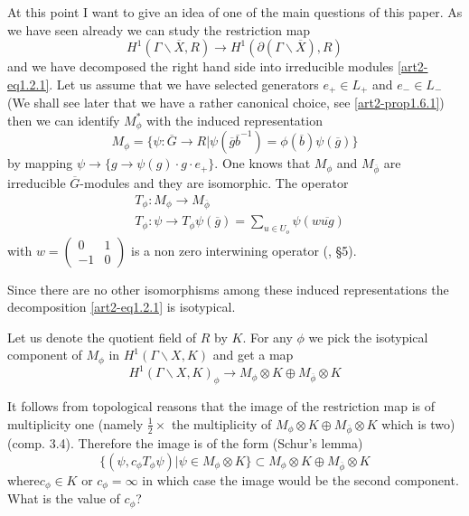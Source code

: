 \subsubsection{}\label{art2-sec1.2.2}
 At this point I want to give an idea of one of the main questions of this paper. As we have seen already we can study the restriction map
$$
H^{1}(\Gamma\backslash \overline{X},R)\to H^{1}(\partial (\Gamma\backslash \overline{X}),R)
$$
and we have decomposed the right hand side into irreducible modules \eqref{art2-eq1.2.1}. Let us assume that we have selected generators $e_{+}\in L_{+}$ and $e_{-}\in  L_{-}$ (We shall see later that we have a rather canonical choice, see \ref{art2-prop1.6.1}) then we can identify $M^{*}_{\phi}$ with the induced representation
$$
M_{\phi}=\{\psi :\overline{G}\to R|\psi(\overline{g}\overline{b}^{-1})=\phi(\overline{b})\psi(\overline{g})\}
$$
by mapping $\psi\to \{g\to \psi(g)\cdot g\cdot e_{+}\}$. One knows that $M_{\phi}$ and $M_{\overline{\phi}}$ are irreducible $\overline{G}$-modules and they are isomorphic. The operator
\begin{align*}
& T_{\phi}:M_{\phi}\to M_{\overline{\phi}}\\
& T_{\phi}:\psi\to T_{\phi}\psi(\overline{g})=\sum\limits_{u\in U_{o}}\psi(w\overline{ug})
\end{align*}
with $w=\left(\begin{smallmatrix} 0 & 1\\ -1 & 0\end{smallmatrix}\right)$ is a non zero interwining operator (\cite{art2-key25}, \S5).

Since there are no other isomorphisms among these induced representations the decomposition \eqref{art2-eq1.2.1} is isotypical.

Let us denote the quotient field of $R$ by $K$. For any $\phi$ we pick the isotypical component of $M_{\phi}$ in $H^{1}(\Gamma\backslash X,K)$ and get a map
$$
H^{1}(\Gamma\backslash X,K)_{\phi}\to M_{\phi}\otimes K\oplus M_{\overline{\phi}}\otimes K
$$

It follows from topological reasons that the image of the restriction map is of multiplicity one (namely $\frac{1}{2}\times$ the multiplicity of $M_{\phi}\otimes K\oplus M_{\overline{\phi}}\otimes K$ which is two) (comp. \cite{art2-key20} 3.4). Therefore the image is of the form (Schur's lemma)
$$
\{(\psi,c_{\phi}T_{\phi}\psi)|\psi\in M_{\phi}\otimes K\}\subset M_{\phi}\otimes K\oplus M_{\overline{\phi}}\otimes K
$$
where\pageoriginale $c_{\phi}\in K$ or $c_{\phi}=\infty$ in which case the image would be the second component. What is the value of $c_{\phi}$?

